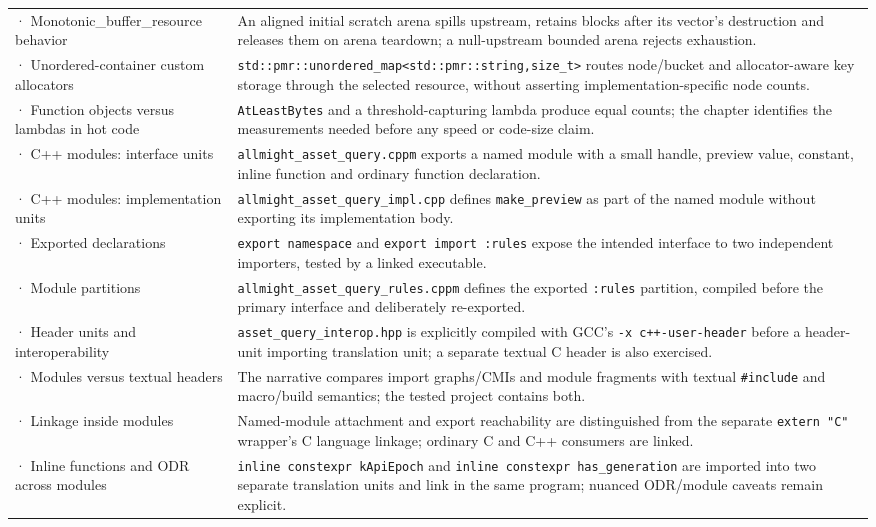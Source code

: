 {\begin{longtable}[]{@{}
  >{\raggedright\arraybackslash}p{}
  >{\raggedright\arraybackslash}p{}@{}}
278 · Monotonic\_buffer\_resource behavior & An aligned initial scratch arena spills upstream, retains blocks after its vector's destruction and releases them on arena teardown; a null-upstream bounded arena rejects exhaustion. \\
279 · Unordered-container custom allocators & \texttt{std::pmr::unordered\_map\textless{}std::pmr::string,size\_t\textgreater{}} routes node/bucket and allocator-aware key storage through the selected resource, without asserting implementation-specific node counts. \\
280 · Function objects versus lambdas in hot code & \texttt{AtLeastBytes} and a threshold-capturing lambda produce equal counts; the chapter identifies the measurements needed before any speed or code-size claim. \\
281 · C++ modules: interface units & \texttt{allmight\_asset\_query.cppm} exports a named module with a small handle, preview value, constant, inline function and ordinary function declaration. \\
282 · C++ modules: implementation units & \texttt{allmight\_asset\_query\_impl.cpp} defines \texttt{make\_preview} as part of the named module without exporting its implementation body. \\
283 · Exported declarations & \texttt{export\ namespace} and \texttt{export\ import\ :rules} expose the intended interface to two independent importers, tested by a linked executable. \\
284 · Module partitions & \texttt{allmight\_asset\_query\_rules.cppm} defines the exported \texttt{:rules} partition, compiled before the primary interface and deliberately re-exported. \\
285 · Header units and interoperability & \texttt{asset\_query\_interop.hpp} is explicitly compiled with GCC's \texttt{-x\ c++-user-header} before a header-unit importing translation unit; a separate textual C header is also exercised. \\
286 · Modules versus textual headers & The narrative compares import graphs/CMIs and module fragments with textual \texttt{\#include} and macro/build semantics; the tested project contains both. \\
287 · Linkage inside modules & Named-module attachment and export reachability are distinguished from the separate \texttt{extern\ "C"} wrapper's C language linkage; ordinary C and C++ consumers are linked. \\
288 · Inline functions and ODR across modules & \texttt{inline\ constexpr\ kApiEpoch} and \texttt{inline\ constexpr\ has\_generation} are imported into two separate translation units and link in the same program; nuanced ODR/module caveats remain explicit. \\

\end{longtable}}
